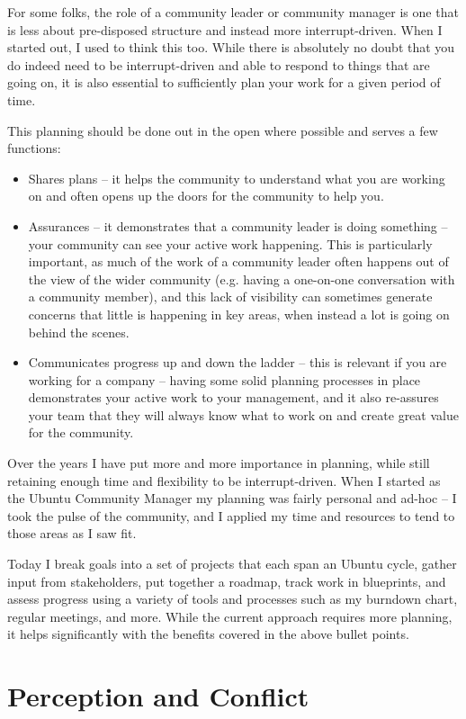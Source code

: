 For some folks, the role of a community leader or community manager is one that is less about pre-disposed structure and instead more interrupt-driven. When I started out, I used to think this too. While there is absolutely no doubt that you do indeed need to be interrupt-driven and able to respond to things that are going on, it is also essential to sufficiently plan your work for a given period of time.

This planning should be done out in the open where possible and serves a few functions:
\begin{itemize}
 \item Shares plans – it helps the community to understand what you are working on and often opens up the doors for the community to help you.
 \item Assurances – it demonstrates that a community leader is doing something – your community can see your active work happening. This is particularly important, as much of the work of a community leader often happens out of the view of the wider community (e.g. having a one-on-one conversation with a community member), and this lack of visibility can sometimes generate concerns that little is happening in key areas, when instead a lot is going on behind the scenes.
 \item Communicates progress up and down the ladder – this is relevant if you are working for a company – having some solid planning processes in place demonstrates your active work to your management, and it also re-assures your team that they will always know what to work on and create great value for the community.
\end{itemize}
Over the years I have put more and more importance in planning, while still retaining enough time and flexibility to be interrupt-driven. When I started as the Ubuntu Community Manager my planning was fairly personal and ad-hoc – I took the pulse of the community, and I applied my time and resources to tend to those areas as I saw fit.

Today I break goals into a set of projects that each span an Ubuntu cycle, gather input from stakeholders, put together a roadmap, track work in blueprints, and assess progress using a variety of tools and processes such as my burndown chart, regular meetings, and more. While the current approach requires more planning, it helps significantly with the benefits covered in the above bullet points.

\section*{Perception and Conflict}

